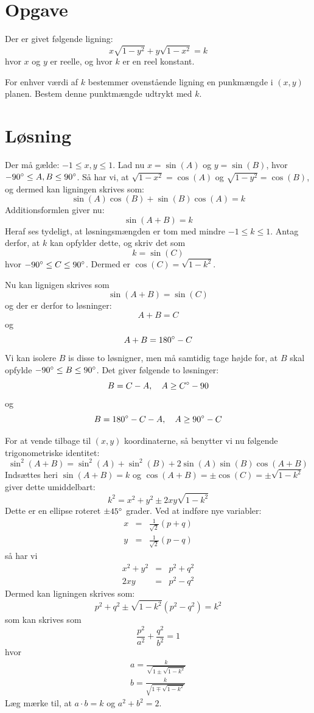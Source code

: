 \documentclass[12pt,oneside,a4paper]{article}
\newcommand{\bas}{\begin{eqnarray*}}
\newcommand{\eas}{\end{eqnarray*}}
\begin{document}
\section*{Opgave}
Der er givet følgende ligning:
$$
x\sqrt{1-y^2} + y\sqrt{1-x^2} = k
$$
hvor $x$ og $y$ er reelle, og hvor $k$ er en reel konstant.

For enhver værdi af $k$ bestemmer ovenstående ligning en punkmængde i $(x,y)$ planen. Bestem denne punktmængde udtrykt med $k$.

\section*{Løsning}
Der må gælde: $-1\le x,y\le 1$. Lad nu $x=\sin(A)$ og
$y=\sin(B)$, hvor $-90\degree \le A,B \le 90\degree$.
Så har vi, at $\sqrt{1-x^2} = \cos(A)$ og $\sqrt{1-y^2} = \cos(B)$, og dermed kan ligningen skrives som:
$$
\sin(A) \cos(B) + \sin(B) \cos(A) = k
$$
Additionsformlen giver nu:
$$
\sin(A+B) = k
$$
Heraf ses tydeligt, at løsningsmængden er tom med mindre $-1\le k\le 1$. Antag derfor, at $k$ kan opfylder dette, og skriv det som 
$$
k = \sin(C)
$$
hvor $-90\degree \le C \le 90\degree$. Dermed er $\cos(C) = \sqrt{1-k^2}$.

Nu kan lignigen skrives som
$$
\sin(A+B) = \sin(C)
$$
og der er derfor to løsninger:
$$
A+B = C
$$
og 
$$
A+B = 180\degree - C
$$
Vi kan isolere $B$ is disse to løsnigner, men må samtidig tage højde for, at $B$ skal opfylde $-90\degree\le B\le 90\degree$. Det giver følgende to løsninger:
$$
B = C-A, \quad A \ge C\degree-90
$$
og
$$
B = 180\degree - C - A, \quad A \ge 90\degree-C
$$

For at vende tilbage til $(x,y)$ koordinaterne, så benytter vi nu følgende trigonometriske identitet:
$$
\sin^2(A+B) = \sin^2 (A) + \sin^2 (B) + 2\sin(A) \sin(B) \cos(A+B)
$$
Indsættes heri $\sin(A+B)=k$ og $\cos(A+B) = \pm\cos(C) = \pm\sqrt{1-k^2}$ giver dette umiddelbart:
$$
k^2 = x^2 + y^2 \pm 2xy \sqrt{1-k^2}
$$
Dette er en ellipse roteret $\pm 45\degree$ grader. Ved at indføre nye variabler:
\bas
x &=& \frac{1}{\sqrt 2} (p+q) \\
y &=& \frac{1}{\sqrt 2} (p-q)
\eas
så har vi
\bas
x^2 + y^2 &=& p^2 + q^2 \\
2xy &=& p^2 - q^2 
\eas
Dermed kan ligningen skrives som:
$$
p^2 + q^2 \pm \sqrt{1-k^2} (p^2-q^2) = k^2
$$
som kan skrives som
$$
\frac{p^2}{a^2} + \frac{q^2}{b^2} = 1
$$
hvor 
\bas
a = \frac{k}{\sqrt{1\pm\sqrt{1-k^2}}} \\
b = \frac{k}{\sqrt{1\mp\sqrt{1-k^2}}}
\eas
Læg mærke til, at $a\cdot b = k$ og $a^2 + b^2 = 2$.
\end{document}

